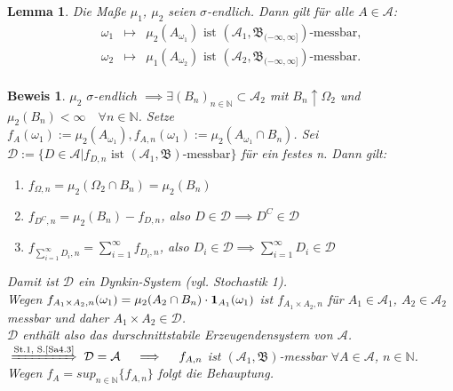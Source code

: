 \documentclass[a4paper,11pt]{book}
\newcommand{\N}{{\mathbb N}}
\newcommand{\ind}{\text{\bf{1}}}
\def\AA{ \mathcal{A} }
\def\BB{ \mathfrak{B} }
\def\folgt{\ensuremath{\implies}}
\newcommand{\folgtnach}[1]{\ensuremath{\DOTSB\;\xRightarrow{\text{#1}}\;}}
\newtheorem{Lem}{Lemma}[chapter]
\theoremstyle{nonumberplain}
\newtheorem{Bew}{Beweis}
\begin{document}
\begin{Lem} \label{Lem3.2}Die Maße $\mu_1$, $\mu_2$ seien $\sigma$-endlich. Dann gilt für alle $A\in\AA$: \\
\begin{eqnarray*}
\omega_1 & \mapsto & \mu_2(A_{\omega_1}) \text{ ist } (\AA_1,\BB_{(-\infty,\infty]})\text{-messbar,} \\
\omega_2 & \mapsto & \mu_1(A_{\omega_2}) \text{ ist } (\AA_2,\BB_{(-\infty,\infty]})\text{-messbar.} \\
\end{eqnarray*}
\end{Lem}
\begin{Bew} $\mu_2$ $\sigma$-endlich $\folgt \exists (B_n)_{n\in\N}\subset\AA_2$ mit $B_n\uparrow\Omega_2$ und $\mu_2(B_n)<\infty\quad\forall n\in\N$. Setze $f_A(\omega_1):=\mu_2(A_{\omega_1}), f_{A,n}(\omega_1):=\mu_2(A_{\omega_1}\cap B_n)$. Sei $\mathcal{D}:=\{D\in\AA|f_{D,n}\text{ ist }(\AA_1,\BB)\text{-messbar}\}$ für ein festes n. Dann gilt: \\
\begin{enumerate}
\item[(i)] $f_{\Omega,n}=\mu_2(\Omega_2\cap B_n)=\mu_2(B_n)$
\item[(ii)] $f_{D^C,n}=\mu_2(B_n) - f_{D,n}$, also $D\in\mathcal{D}\folgt D^C\in\mathcal{D}$
\item[(iii)] $f_{\sum_{i=1}^{\infty}D_i,n} = \sum_{i=1}^{\infty}f_{D_i,n}$, also $D_i\in\mathcal{D}\folgt\sum_{i=1}^{\infty}D_i\in\mathcal{D}$
\end{enumerate}
Damit ist $\mathcal{D}$ ein Dynkin-System (vgl. Stochastik 1). \\
Wegen $f_{A_1\times A_2,n}(\omega_1) = \mu_2(A_2\cap B_n)\cdot \ind_{A_1}(\omega_1)$ ist $f_{A_1\times A_2,n}$ für $A_1\in\AA_1$, $A_2\in\AA_2$ messbar und daher $A_1\times A_2\in\mathcal{D}$. \\
$\mathcal{D}$ enthält also das durschnittstabile Erzeugendensystem von $\AA$. \\
$\folgtnach{St.1, S.\ref{Sa4.3}}\mathcal{D}=\AA \quad\folgt\quad f_{A,n}$ ist $(\AA_1,\BB)$-messbar $\forall A\in\AA$, $n\in\N$. \\
Wegen $f_A=sup_{n\in\N}\{f_{A,n}\}$ folgt die Behauptung.
\end{Bew}
\end{document}
